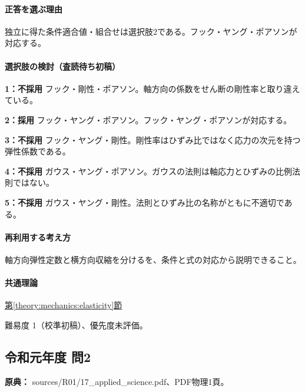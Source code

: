 \paragraph{正答を選ぶ理由} 独立に得た条件適合値・組合せは選択肢2である。フック・ヤング・ポアソンが対応する。

\paragraph{選択肢の検討（査読待ち初稿）}\mbox{}\par

\noindent\textbf{1：不採用} フック・剛性・ポアソン。軸方向の係数をせん断の剛性率と取り違えている。\par

\noindent\textbf{2：採用} フック・ヤング・ポアソン。フック・ヤング・ポアソンが対応する。\par

\noindent\textbf{3：不採用} フック・ヤング・剛性。剛性率はひずみ比ではなく応力の次元を持つ弾性係数である。\par

\noindent\textbf{4：不採用} ガウス・ヤング・ポアソン。ガウスの法則は軸応力とひずみの比例法則ではない。\par

\noindent\textbf{5：不採用} ガウス・ヤング・剛性。法則とひずみ比の名称がともに不適切である。\par

\paragraph{再利用する考え方} 軸方向弾性定数と横方向収縮を分けるを、条件と式の対応から説明できること。

\paragraph{共通理論} \hyperref[theory:mechanics:elasticity]{第\ref*{theory:mechanics:elasticity}節}

\par 難易度 1（校準初稿）、優先度未評価。

\subsection{令和元年度 問2}
\label{q:r01-reg-applied-02}

\noindent\textbf{原典：} sources/R01/17\_applied\_science.pdf、PDF物理1頁。

